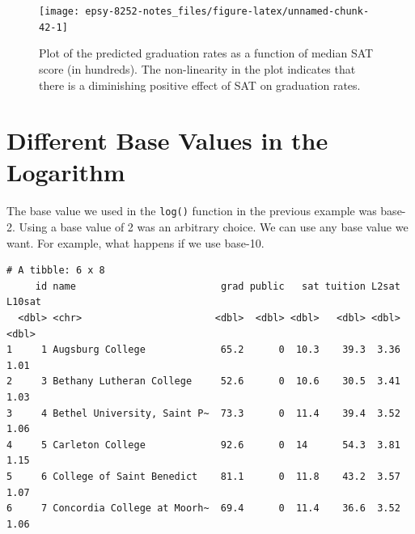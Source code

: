 \documentclass[]{book}
\newenvironment{Shaded}{\begin{snugshade}}{\end{snugshade}}
\newcommand{\CommentTok}[1]{\textcolor[rgb]{0.56,0.35,0.01}{\textit{#1}}}
\newcommand{\DataTypeTok}[1]{\textcolor[rgb]{0.13,0.29,0.53}{#1}}
\newcommand{\DecValTok}[1]{\textcolor[rgb]{0.00,0.00,0.81}{#1}}
\newcommand{\KeywordTok}[1]{\textcolor[rgb]{0.13,0.29,0.53}{\textbf{#1}}}
\newcommand{\NormalTok}[1]{#1}
\newcommand{\OperatorTok}[1]{\textcolor[rgb]{0.81,0.36,0.00}{\textbf{#1}}}
\newcommand{\StringTok}[1]{\textcolor[rgb]{0.31,0.60,0.02}{#1}}
\begin{document}
\begin{figure}

{\centering \texttt{[image: epsy-8252-notes\_files/figure-latex/unnamed-chunk-42-1]} 

}

\caption{Plot of the predicted graduation rates as a function of median SAT score (in hundreds). The non-linearity in the plot indicates that there is a diminishing positive effect of SAT on graduation rates.}\label{fig:unnamed-chunk-42}
\end{figure}

\hypertarget{different-base-values-in-the-logarithm}{%
\section{Different Base Values in the Logarithm}\label{different-base-values-in-the-logarithm}}

The base value we used in the \texttt{log()} function in the previous example was base-2. Using a base value of 2 was an arbitrary choice. We can use any base value we want. For example, what happens if we use base-10.

\begin{Shaded}
\end{Shaded}

\begin{verbatim}
# A tibble: 6 x 8
     id name                         grad public   sat tuition L2sat L10sat
  <dbl> <chr>                       <dbl>  <dbl> <dbl>   <dbl> <dbl>  <dbl>
1     1 Augsburg College             65.2      0  10.3    39.3  3.36   1.01
2     3 Bethany Lutheran College     52.6      0  10.6    30.5  3.41   1.03
3     4 Bethel University, Saint P~  73.3      0  11.4    39.4  3.52   1.06
4     5 Carleton College             92.6      0  14      54.3  3.81   1.15
5     6 College of Saint Benedict    81.1      0  11.8    43.2  3.57   1.07
6     7 Concordia College at Moorh~  69.4      0  11.4    36.6  3.52   1.06
\end{verbatim}
\end{document}
